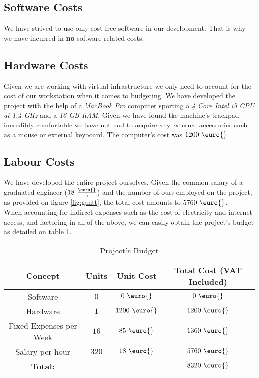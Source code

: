        \subsection{Software Costs}
            We have strived to use only cost-free software in our development. That is why we have incurred in \textbf{no} software related costs.\\

        \subsection{Hardware Costs}
            Given we are working with virtual infrastructure we only need to account for the cost of our workstation when it comes to budgeting. We have developed the project with the help of a \textit{MacBook Pro} computer sporting a \textit{4 Core Intel i5 CPU at 1,4 GHz} and a \textit{16 GB RAM}. Given we have found the machine's trackpad incredibly comfortable we have not had to acquire any external accessories such as a mouse or external keyboard. The computer's cost was $1200\ \text{\euro{}}$.\\

        \subsection{Labour Costs}
            We have developed the entire project ourselves. Given the common salary of a graduated engineer ($18\ \frac{\text{\euro{}}}{h}$) and the number of ours employed on the project, as provided on figure \ref{fig:gantt}, the total cost amounts to $5760\ \text{\euro{}}$.\\

        When accounting for indirect expenses such as the cost of electricity and internet access, and factoring in all of the above, we can easily obtain the project's budget as detailed on table \ref{tab:budget}.\\

        \begin{table}
            \centering
            \begin{tabular}{|c|c|c|c|}
                \hline
                \textbf{Concept} & \textbf{Units} & \textbf{Unit Cost} & \textbf{Total Cost (VAT Included)}\\
                \hline
                Software & $0$ & $0\ \text{\euro{}}$ & $0\ \text{\euro{}}$\\
                \hline
                Hardware & $1$ & $1200\ \text{\euro{}}$ & $1200\ \text{\euro{}}$\\
                \hline
                Fixed Expenses per Week & $16$ & $85\ \text{\euro{}}$ & $1360\ \text{\euro{}}$\\
                \hline
                Salary per hour & $320$ & $18\ \text{\euro{}}$ & $5760\ \text{\euro{}}$\\
                \hline
                \textbf{Total:} & & & $8320\ \text{\euro{}}$\\
                \hline
            \end{tabular}
            \caption{Project's Budget}
            \label{tab:budget}
        \end{table}
